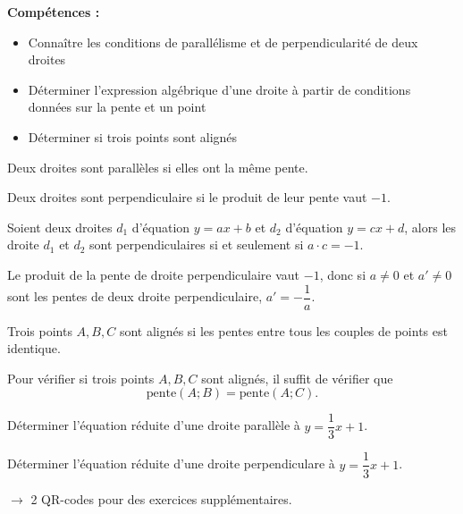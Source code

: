 \documentclass[a4paper,12pt]{report}
\begin{document}
{\bfseries Compétences :}
\begin{itemize}
\item Connaître les conditions de parallélisme et de perpendicularité de deux droites
\item Déterminer l'expression algébrique d'une droite à partir de conditions données sur la pente et un point
\item Déterminer si trois points sont alignés
\end{itemize}
\begin{defi}[parallèle]
Deux droites sont parallèles si elles ont la même pente.
\end{defi}

\begin{defi}[perpendiculaire]
Deux droites sont perpendiculaire si le produit de leur pente vaut $-1$.
 
Soient deux droites $d_1$ d'équation $y=ax+b$ et $d_2$ d'équation $y=cx+d$, alors les droite $d_1$ et $d_2$ sont perpendiculaires si et seulement si $a\cdot c=-1$.
\end{defi}

\begin{rem}
Le produit de la pente de droite perpendiculaire vaut $-1$, donc si $a\neq 0$ et $a'\neq 0$ sont les pentes de deux droite perpendiculaire, $a'=-\dfrac{1}{a}$.
\end{rem}

\begin{boiteExT}[perpendiculaire à $y=2x-1$ passant par le point $(3;4)$]
\vspace{6cm}
\end{boiteExT}

\begin{defi}
Trois points $A, B, C$ sont alignés si les pentes entre tous les couples de points est identique. 
\end{defi}
\begin{rem}
	Pour vérifier si trois points $A, B, C$ sont alignés, il suffit de vérifier que \[\text{pente}(A;B)=\text{pente}(A;C).\]
\end{rem}
\begin{boiteExT}
	\vspace{4cm}
\end{boiteExT}
\vspace{-0.7cm}

\begin{exo}
Déterminer l'équation réduite d'une droite parallèle à $y=\dfrac{1}{3}x+1$.
\end{exo}
\vspace{-0.7cm}

\begin{exo}
Déterminer l'équation réduite d'une droite perpendiculare à $y=\dfrac{1}{3}x+1$.
\end{exo}
$\rightarrow$ 2 QR-codes pour des exercices supplémentaires.
\end{document}

